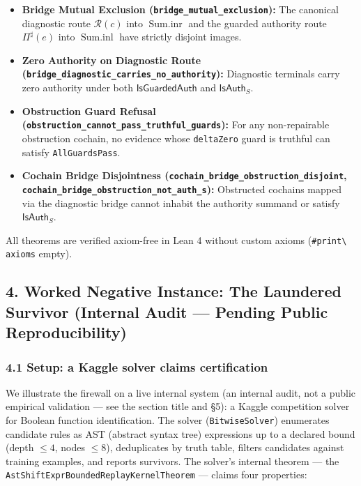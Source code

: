 \documentclass[
  10pt,
]{article}
\providecommand{\tightlist}{%
  \setlength{\itemsep}{0pt}\setlength{\parskip}{0pt}}
\providecommand{\tightlist}{%
  \setlength{\itemsep}{0pt}\setlength{\parskip}{0pt}}
\DeclareRobustCommand{\texttt}[1]{{\paperSymbolFont\nolinkurl{#1}}}
\begin{document}
\begin{enumerate}
  \begin{itemize}
  \tightlist
  \item
    \textbf{Bridge Mutual Exclusion (\texttt{bridge\_mutual\_exclusion}):} The canonical diagnostic route \protect\hypertarget{math-E0071-0100}{}{\(\mathcal{R}(c)\)} into \protect\hypertarget{math-E0072-0101}{}{\(\operatorname{Sum.inr}\)} and the guarded authority route \protect\hypertarget{math-E0073-0102}{}{\(\Pi^\sharp(e)\)} into \protect\hypertarget{math-E0074-0103}{}{\(\operatorname{Sum.inl}\)} have strictly disjoint images.
  \item
    \textbf{Zero Authority on Diagnostic Route (\texttt{bridge\_diagnostic\_carries\_no\_authority}):} Diagnostic terminals carry zero authority under both \protect\hypertarget{math-E0065-0104}{}{\(\mathsf{IsGuardedAuth}\)} and \protect\hypertarget{math-E0033-0105}{}{\(\mathsf{IsAuth}_S\)}.
  \item
    \textbf{Obstruction Guard Refusal (\texttt{obstruction\_cannot\_pass\_truthful\_guards}):} For any non-repairable obstruction cochain, no evidence whose \texttt{deltaZero} guard is truthful can satisfy \texttt{AllGuardsPass}.
  \item
    \textbf{Cochain Bridge Disjointness (\texttt{cochain\_bridge\_obstruction\_disjoint}, \texttt{cochain\_bridge\_obstruction\_not\_auth\_s}):} Obstructed cochains mapped via the diagnostic bridge cannot inhabit the authority summand or satisfy \protect\hypertarget{math-E0033-0106}{}{\(\mathsf{IsAuth}_S\)}.
  \end{itemize}
\end{enumerate}

All theorems are verified axiom-free in Lean 4 without custom axioms (\texttt{\#print\ axioms} empty).

\subsection{4. Worked Negative Instance: The Laundered Survivor (Internal Audit --- Pending Public Reproducibility)}\label{worked-negative-instance-the-laundered-survivor-internal-audit-pending-public-reproducibility}

\subsubsection{4.1 Setup: a Kaggle solver claims certification}\label{setup-a-kaggle-solver-claims-certification}

We illustrate the firewall on a live internal system (an internal audit, not a public empirical validation --- see the section title and §5): a Kaggle competition solver for Boolean function identification. The solver (\texttt{BitwiseSolver}) enumerates candidate rules as AST (abstract syntax tree) expressions up to a declared bound (depth \protect\hypertarget{math-E0075-0107}{}{\(\leq 4\)}, nodes \protect\hypertarget{math-E0076-0108}{}{\(\leq 8\)}), deduplicates by truth table, filters candidates against training examples, and reports survivors. The solver's internal theorem --- the \texttt{AstShiftExprBoundedReplayKernelTheorem} --- claims four properties:
\end{document}
